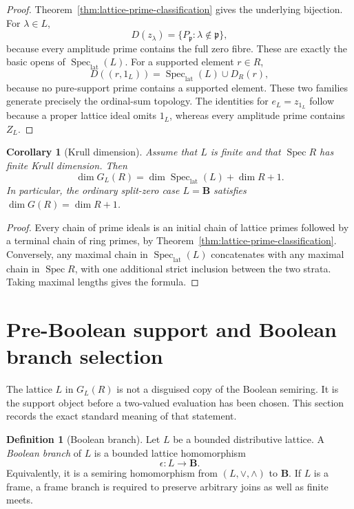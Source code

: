 \documentclass[11pt]{amsart}
\numberwithin{equation}{section}
\newtheorem{corollary}[theorem]{Corollary}
\theoremstyle{definition}
\newtheorem{definition}[theorem]{Definition}
\newcommand{\B}{\mathbf B}
\newcommand{\Spec}{\operatorname{Spec}}
\newcommand{\SpecLat}{\operatorname{Spec}_{\mathrm{lat}}}
\begin{document}
\begin{proof}
Theorem~\ref{thm:lattice-prime-classification} gives the underlying
bijection.  For $\lambda\in L$,
\[
D(z_\lambda)
=\{P_{\mathfrak p}:\lambda\notin\mathfrak p\},
\]
because every amplitude prime contains the full zero fibre.  These are
exactly the basic opens of $\SpecLat(L)$.  For a supported element
$r\in R$,
\[
D((r,1_L))
=\SpecLat(L)\cup D_R(r),
\]
because no pure-support prime contains a supported element.  These two
families generate precisely the ordinal-sum topology.  The identities for
$e_L=z_{1_L}$ follow because a proper lattice ideal omits $1_L$, whereas
every amplitude prime contains $Z_L$.
\end{proof}

\begin{corollary}[Krull dimension]
\label{cor:lattice-split-dimension}
Assume that $L$ is finite and that $\Spec R$ has finite Krull dimension.
Then
\[
\boxed{
\dim G_L(R)=\dim\SpecLat(L)+\dim R+1.
}
\]
In particular, the ordinary split-zero case $L=\B$ satisfies
$\dim G(R)=\dim R+1$.
\end{corollary}

\begin{proof}
Every chain of prime ideals is an initial chain of lattice primes followed
by a terminal chain of ring primes, by
Theorem~\ref{thm:lattice-prime-classification}.  Conversely, any maximal
chain in $\SpecLat(L)$ concatenates with any maximal chain in $\Spec R$,
with one additional strict inclusion between the two strata.  Taking
maximal lengths gives the formula.
\end{proof}


\section{Pre-Boolean support and Boolean branch selection}
\label{sec:preboolean-support}

The lattice $L$ in $G_L(R)$ is not a disguised copy of the Boolean
semiring.  It is the support object before a two-valued evaluation has
been chosen.  This section records the exact standard meaning of that
statement.

\begin{definition}[Boolean branch]
Let $L$ be a bounded distributive lattice.  A \emph{Boolean branch} of
$L$ is a bounded lattice homomorphism
\[
\epsilon:L\longrightarrow\B.
\]
Equivalently, it is a semiring homomorphism from $(L,\vee,\wedge)$ to
$\B$.  If $L$ is a frame, a frame branch is required to preserve arbitrary
joins as well as finite meets.
\end{definition}
\end{document}
